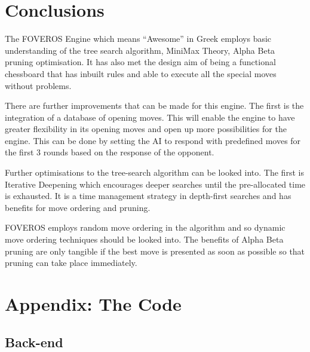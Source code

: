 \documentclass[11pt,a4paper]{article}
\begin{document}
\newpage
\section{Conclusions}

\indent\indent The FOVEROS Engine which means “Awesome” in Greek employs basic understanding of the tree search algorithm, MiniMax Theory, Alpha Beta pruning optimisation. It has also met the design aim of being a functional chessboard that has inbuilt rules and able to execute all the special moves without problems.

	There are further improvements that can be made for this engine. The first is the integration of a database of opening moves. This will enable the engine to have greater flexibility in its opening moves and open up more possibilities for the engine. This can be done by setting the AI to respond with predefined moves for the first 3 rounds based on the response of the opponent.

	Further optimisations to the tree-search algorithm can be looked into. The first is Iterative Deepening which encourages deeper searches until the pre-allocated time is exhausted. It is a time management strategy in depth-first searches and has benefits for move ordering and pruning.\cite{chess9}

	FOVEROS employs random move ordering in the algorithm and so dynamic move ordering techniques should be looked into. The benefits of Alpha Beta pruning are only tangible if the best move is presented as soon as possible so that pruning can take place immediately.\cite{chess8}
 


\newpage


\newpage

\appendix
\section{Appendix: The Code}
\subsection{Back-end}
\end{document}
